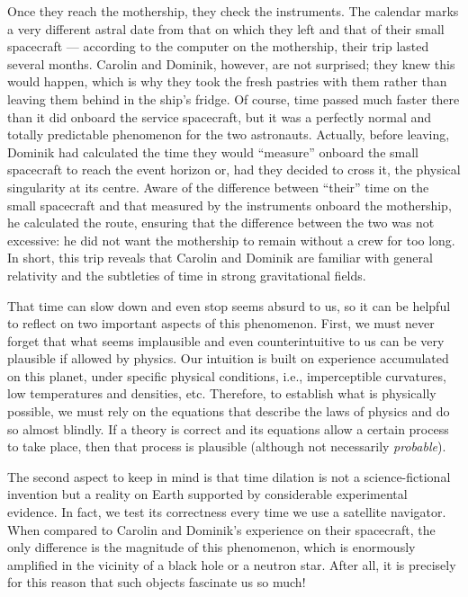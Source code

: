 Once they reach the mothership, they check the instruments. The calendar marks a very
different astral date from that on which they left and that of their small spacecraft
--- according to the computer on the mothership, their trip lasted several months.
Carolin and Dominik, however, are not surprised; they knew this would happen, which is
why they took the fresh pastries with them rather than leaving them behind in the ship's
fridge. Of course, time passed much faster there than it did onboard the service
spacecraft, but it was a perfectly normal and totally predictable phenomenon for the two
astronauts. Actually, before leaving, Dominik had calculated the time they would
``measure'' onboard the small spacecraft to reach the event horizon or, had they decided
to cross it, the physical singularity at its centre. Aware of the
difference between ``their'' time on the small spacecraft and that measured by the
instruments onboard the mothership, he calculated the route, ensuring that the
difference between the two was not excessive: he did not want the mothership to remain
without a crew for too long. In short, this trip reveals that Carolin and Dominik are
familiar with general relativity and the subtleties of time in strong gravitational
fields.

That time can slow down and even stop seems absurd to us, so it can be helpful to
reflect on two important aspects of this phenomenon. First, we must never forget that
what seems implausible and even counterintuitive to us can be very plausible if allowed
by physics. Our intuition is built on experience accumulated on this planet, under
specific physical conditions, i.e., imperceptible curvatures, low temperatures and
densities, etc. Therefore, to establish what is physically possible, we must rely on the
equations that describe the laws of physics and do so almost blindly. If a theory is
correct and its equations allow a certain process to take place, then that process is
plausible (although not necessarily \emph{probable}).

The second aspect to keep in mind is that time dilation is not a
science-fictional invention but a reality on Earth supported by considerable
experimental evidence. In fact, we test its correctness every time we use a satellite
navigator. When compared to Carolin and Dominik's experience on their spacecraft, the
only difference is the magnitude of this phenomenon, which is enormously amplified in
the vicinity of a black hole or a neutron star. After all, it is precisely for this
reason that such objects fascinate us so much!

